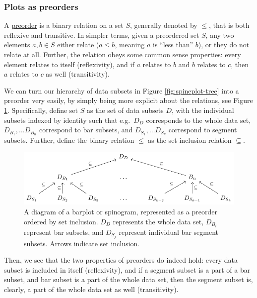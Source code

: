 \documentclass[
]{book}
\theoremstyle{definition}
\theoremstyle{definition}
\theoremstyle{definition}
\theoremstyle{definition}
\theoremstyle{remark}
\begin{document}
\subsubsection{Plots as preorders}\label{plots-as-preorders}

A \hyperref[preorders]{preorder} is a binary relation on a set \(S\), generally denoted by \(\leq\), that is both reflexive and transitive. In simpler terms, given a preordered set \(S\), any two elements \(a, b \in S\) either relate (\(a \leq b\), meaning \(a\) is ``less than'' \(b\)), or they do not relate at all. Further, the relation obeys some common sense properties: every element relates to itself (reflexivity), and if \(a\) relates to \(b\) and \(b\) relates to \(c\), then \(a\) relates to \(c\) as well (transitivity).

We can turn our hierarchy of data subsets in Figure \ref{fig:spineplot-tree} into a preorder very easily, by simply being more explicit about the relations, see Figure \ref{fig:barplot-preorder}. Specifically, define set \(S\) as the set of data subsets \(D\), with the individual subsets indexed by identity such that e.g.~\(D_D\) corresponds to the whole data set, \(D_{B_1}, \ldots D_{B_n}\) correspond to bar subsets, and \(D_{S_1}, \ldots D_{S_k}\) correspond to segment subsets. Further, define the binary relation \(\leq\) as the set inclusion relation \(\subseteq\).

\begin{figure}

{\centering \includegraphics[width=1\linewidth,height=1\textheight]{./figures/barplot-preorder} 

}

\caption{A diagram of a barplot or spinogram, represented as a preorder ordered by set inclusion. $D_D$ represents the whole data set, $D_{B_i}$ represent bar subsets, and $D_{S_j}$ represent individual bar segment subsets. Arrows indicate set inclusion.}\label{fig:barplot-preorder}
\end{figure}

Then, we see that the two properties of preorders do indeed hold: every data subset is included in itself (reflexivity), and if a segment subset is a part of a bar subset, and bar subset is a part of the whole data set, then the segment subset is, clearly, a part of the whole data set as well (transitivity).
\end{document}
